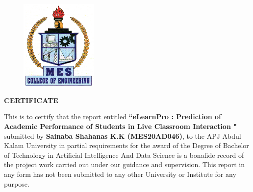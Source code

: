\begin{figure}[h!]
            \centering
            \includegraphics[width=1.5in]{Logo.png}\\
            
\end{figure}
\begin{center}
\large \textbf{\fontsize{14}{12}\selectfont CERTIFICATE}
\end{center}
 \begin{doublespace}
 This is to certify that the report entitled \textbf{\fontsize{14}{12}\selectfont  ``eLearnPro : Prediction of Academic Performance of Students in Live Classroom Interaction "} submitted by \textbf{\fontsize{12}{12}\selectfont Sainaba Shahanas K.K (MES20AD046)}, to the APJ Abdul Kalam University in partial requirements for the award of the Degree of Bachelor of Technology in Artificial Intelligence And Data Science is a bonafide record of the project work carried out under our
guidance and supervision. This report in any form has not been submitted to any
other University or Institute for any purpose. 
 \end{doublespace}

\vspace{4cm}

